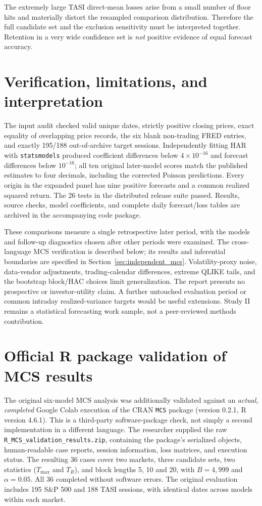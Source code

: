The extremely large TASI direct-mean losses arise from a small number of floor hits and materially distort the resampled comparison distribution. Therefore the full candidate set and the exclusion sensitivity must be interpreted together. Retention in a very wide confidence set is \emph{not} positive evidence of equal forecast accuracy.

\section{Verification, limitations, and interpretation}
The input audit checked valid unique dates, strictly positive closing prices, exact equality of overlapping price records, the six blank non-trading FRED entries, and exactly 195/188 out-of-archive target sessions. Independently fitting HAR with \texttt{statsmodels} produced coefficient differences below $4\times10^{-16}$ and forecast differences below $10^{-16}$; all ten original later-model scores match the published estimates to four decimals, including the corrected Poisson predictions. Every origin in the expanded panel has nine positive forecasts and a common realized squared return. The 26 tests in the distributed release suite passed. Results, source checks, model coefficients, and complete daily forecast/loss tables are archived in the accompanying code package.

These comparisons measure a single retrospective later period, with the models and follow-up diagnostics chosen after other periods were examined. The cross-language MCS verification is described below; its results and inferential boundaries are specified in Section~\ref{sec:independent_mcs}. Volatility-proxy noise, data-vendor adjustments, trading-calendar differences, extreme QLIKE tails, and the bootstrap block/HAC choices limit generalization. The report presents no prospective or investor-utility claim. A further untouched evaluation period or common intraday realized-variance targets would be useful extensions. Study II remains a statistical forecasting work sample, not a peer-reviewed methods contribution.


\section{Official R package validation of MCS results}\label{sec:official_rmcs}
The original six-model MCS analysis was additionally validated against an \emph{actual,
completed} Google Colab execution of the CRAN \texttt{MCS} package (version
0.2.1, R version 4.6.1). This is a third-party software-package check, not
simply a second implementation in a different language. The researcher supplied
the raw \texttt{R\_MCS\_validation\_results.zip}, containing the package's
serialized objects, human-readable case reports, session information, loss
matrices, and execution status. The resulting 36 cases cover two markets,
three candidate sets, two statistics ($T_{\max}$ and $T_R$), and block lengths
5, 10 and 20, with $B=4{,}999$ and $\alpha=0.05$. All 36 completed without
software errors. The original evaluation includes 195 S\&P 500 and 188 TASI
sessions, with identical dates across models within each market.

